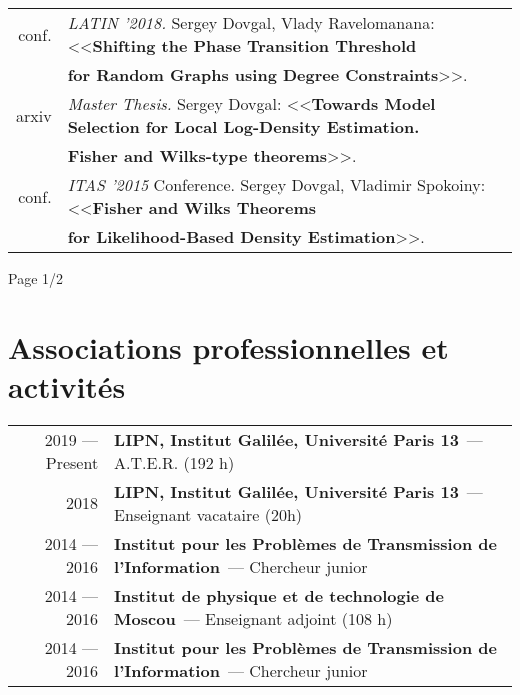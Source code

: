 \documentclass[a4paper,10pt]{article} %
\begin{document}
\begin{tabular}{rl}
\\
conf. & \textit{LATIN '2018.} Sergey Dovgal, Vlady Ravelomanana:
 <<\textbf{Shifting the Phase Transition Threshold}\\
& \textbf{for Random Graphs using
Degree Constraints}>>.
\\
arxiv & \textit{Master Thesis.} Sergey Dovgal:
 <<\textbf{Towards Model Selection for Local Log-Density Estimation.}\\
&\textbf{Fisher and Wilks-type theorems}>>.
\\
conf. & \textit{ITAS '2015} Conference. Sergey Dovgal, Vladimir Spokoiny: 
 <<\textbf{Fisher and Wilks Theorems}\\&\textbf{for Likelihood-Based Density
Estimation}>>.

\end{tabular}

\vfill

Page 1/2

\newpage

%
\section{Associations professionnelles et activités}
%
\begin{tabular}{rl}
2019 --- Present & \textbf {LIPN, Institut Galilée, Université Paris 13}~---
    A.T.E.R. (192 h)\\
2018 & \textbf {LIPN, Institut Galilée, Université Paris 13}~---
    Enseignant vacataire (20h)\\
%
2014 --- 2016 & \textbf{Institut pour les Problèmes de Transmission de
     l'Information}~--- Chercheur junior \\
%
2014 --- 2016 & \textbf {Institut de physique et de technologie de Moscou}~---
     Enseignant adjoint (108 h)\\
%
2014 --- 2016 & \textbf{Institut pour les Problèmes de Transmission de
     l'Information}~--- Chercheur junior \\
%
\end{tabular}
\end{document}
